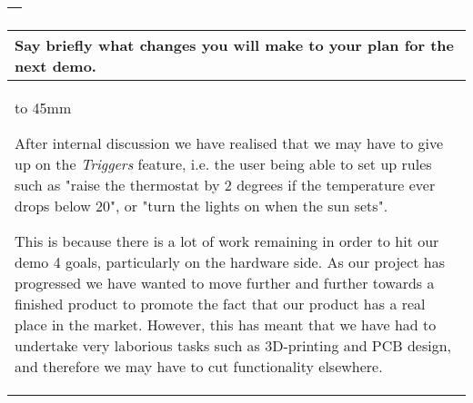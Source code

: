 \documentclass[a4paper]{article}
\newcommand{\colWidth}{141mm}
\begin{document}
\begin{center}
\begin{tabular}{|p{\colWidth}|}
{  }
  \\
  \hline
\end{tabular}
\vskip 5mm


\begin{tabular}{|p{\colWidth}|}
	\hline
	\cellcolor{blue!25}\large
	\textbf{Say briefly what changes you will make to your plan for the next demo.}
	\\ \hline
	\vtop to 45mm{
		After internal discussion we have realised that we may have to give up on the \textit{Triggers} feature,
		i.e. the user being able to set up rules such as "raise the thermostat by 2 degrees if the temperature ever drops below 20",
		or "turn the lights on when the sun sets".

		This is because there is a lot of work remaining in order to hit our demo 4 goals, particularly on the hardware side. As our project
		has progressed we have wanted to move further and further towards a finished product to promote the fact that our product has a real place in the market.
		However, this has meant that we have had to undertake very laborious tasks such as 3D-printing and PCB design, and therefore we may
		have to cut functionality elsewhere.
  	}
  \\
  \hline
\end{tabular}

\end{center}
  
\end{document}
